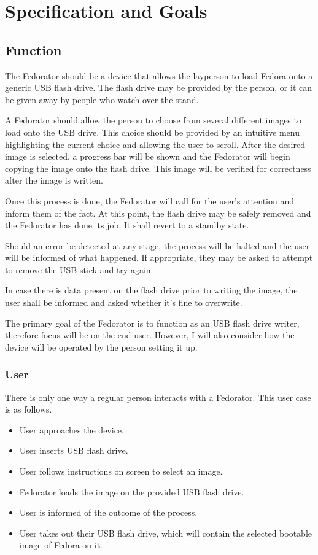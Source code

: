 \chapter{Specification and Goals}
    \section{Function}
        The Fedorator should be a device that allows the layperson to load Fedora onto a generic USB flash drive.  The flash drive may be provided by the person, or it can be given away by people who watch over the stand.
        
        A Fedorator should allow the person to choose from several different images to load onto the USB drive.  This choice should be provided by an intuitive menu highlighting the current choice and allowing the user to scroll.  After the desired image is selected, a progress bar will be shown and the Fedorator will begin copying the image onto the flash drive.  This image will be verified for correctness after the image is written.
        
        Once this process is done, the Fedorator will call for the user's attention and inform them of the fact.  At this point, the flash drive may be safely removed and the Fedorator has done its job.  It shall revert to a standby state.
        
        Should an error be detected at any stage, the process will be halted and the user will be informed of what happened.  If appropriate, they may be asked to attempt to remove the USB stick and try again.
        
        In case there is data present on the flash drive prior to writing the image, the user shall be informed and asked whether it's fine to overwrite.
        
        The primary goal of the Fedorator is to function as an USB flash drive writer, therefore focus will be on the end user.  However, I will also consider how the device will be operated by the person setting it up.
        \subsection{User}
            There is only one way a regular person interacts with a Fedorator.  This user case is as follows.
            
            \begin{itemize}
                \item User approaches the device.
                \item User inserts USB flash drive.
                \item User follows instructions on screen to select an image.
                \item Fedorator loads the image on the provided USB flash drive.
                \item User is informed of the outcome of the process.
                \item User takes out their USB flash drive, which will contain the selected bootable image of Fedora on it.
            \end{itemize}
